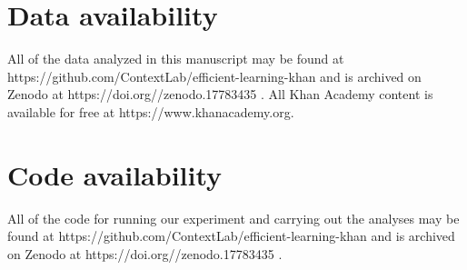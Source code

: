 \documentclass[10pt]{article}
\begin{document}
\section*{Data availability}

All of the data analyzed in this manuscript may be found at
https://github.com/Con\-text\-Lab/eff\-ic\-ient-learn\-ing-khan and is archived 
on Zenodo at https://doi.org//\-zenodo.17783435 \citep{FitzEtal25}.
All Khan Academy content is available for free at https://www.khan\-academy.org.

\section*{Code availability}

All of the code for running our experiment and carrying out the analyses may be
found at https://github.com/Con\-text\-Lab/eff\-ic\-ient-learn\-ing-khan
and is archived on Zenodo at https://doi.org//\-zenodo.17783435 \citep{FitzEtal25}.


%
%
\end{document}
